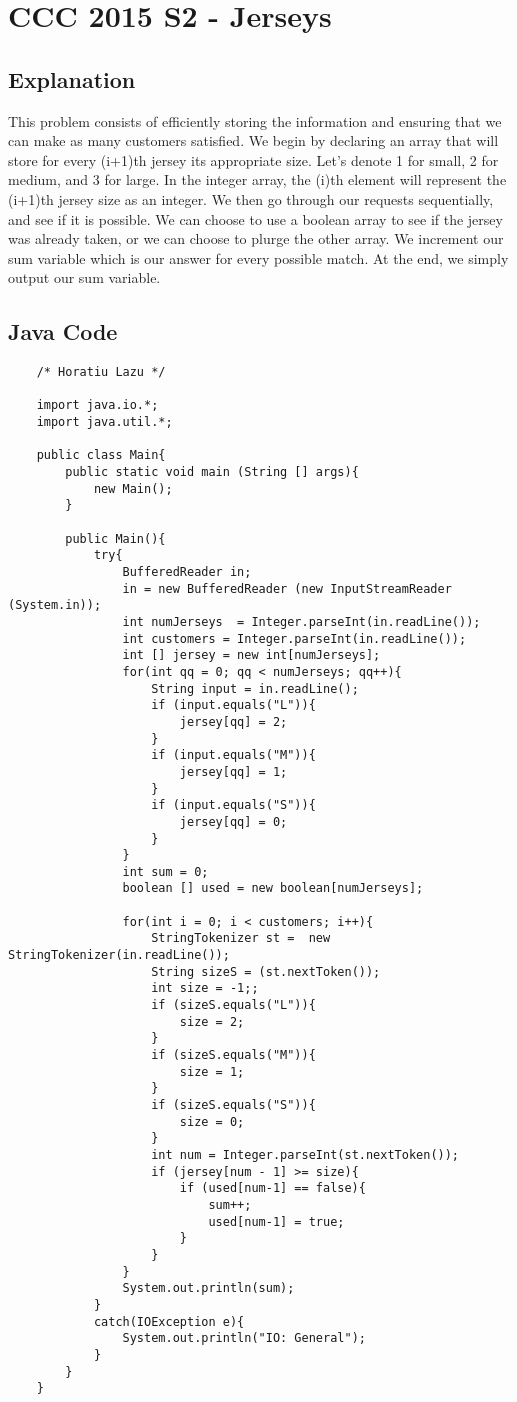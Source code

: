 \documentclass[52pt]{article}
\begin{document}
	\section {CCC 2015 S2 - Jerseys}
	\subsection {Explanation}
	This problem consists of efficiently storing the information and ensuring that we can make as many customers satisfied. We begin by declaring an array that will store for every (i+1)th jersey its appropriate size. Let's denote 1 for small, 2 for medium, and 3 for large. In the integer array, the (i)th element will represent the (i+1)th jersey size as an integer. We then go through our requests sequentially, and see if it is possible. We can choose to use a boolean array to see if the jersey was already taken, or we can choose to plurge the other array. We increment our sum variable which is our answer for every possible match. At the end, we simply output our sum variable.
	
	\subsection {Java Code}
	\begin{lstlisting}
	/* Horatiu Lazu */

	import java.io.*;
	import java.util.*;

	public class Main{
		public static void main (String [] args){
			new Main();
		}
		
		public Main(){
			try{
				BufferedReader in;
				in = new BufferedReader (new InputStreamReader (System.in));
				int numJerseys  = Integer.parseInt(in.readLine());
				int customers = Integer.parseInt(in.readLine());
				int [] jersey = new int[numJerseys];
				for(int qq = 0; qq < numJerseys; qq++){
					String input = in.readLine();
					if (input.equals("L")){
						jersey[qq] = 2;
					}
					if (input.equals("M")){
						jersey[qq] = 1;
					}
					if (input.equals("S")){
						jersey[qq] = 0;
					}
				}
				int sum = 0;
				boolean [] used = new boolean[numJerseys];
				
				for(int i = 0; i < customers; i++){
					StringTokenizer st =  new StringTokenizer(in.readLine());
					String sizeS = (st.nextToken());
					int size = -1;;
					if (sizeS.equals("L")){
						size = 2;
					}
					if (sizeS.equals("M")){
						size = 1;
					}
					if (sizeS.equals("S")){
						size = 0;
					}
					int num = Integer.parseInt(st.nextToken());
					if (jersey[num - 1] >= size){
						if (used[num-1] == false){
							sum++;
							used[num-1] = true;
						}
					}                          
				}
				System.out.println(sum);
			}
			catch(IOException e){
				System.out.println("IO: General");
			}
		}
	}
	\end{lstlisting}
	\newpage
	
\end{document}
